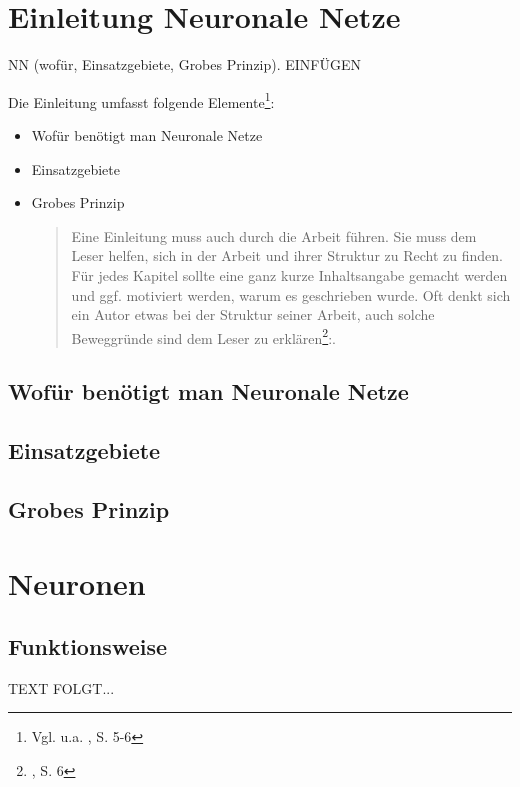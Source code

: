 \newpage
\thispagestyle{empty}
\section{Einleitung Neuronale Netze}\label{sec:einleitung_nn}   
NN (wofür, Einsatzgebiete, Grobes Prinzip). EINFÜGEN

\vspace{1cm}
\begin{tcolorbox}[title={Inhalt}]
Die Einleitung umfasst folgende Elemente\footnote{Vgl. u.a. \cite{BBoJ}, S. 5-6}:
\begin{itemize}
\item Wofür benötigt man Neuronale Netze
\item Einsatzgebiete
\item Grobes Prinzip
  \begin{quotation}
    Eine Einleitung muss auch durch die Arbeit führen. Sie muss dem Leser helfen, sich in der Arbeit und ihrer Struktur zu Recht zu finden. Für jedes Kapitel sollte eine ganz kurze Inhaltsangabe gemacht werden und ggf. motiviert werden, warum es geschrieben wurde. Oft denkt sich ein Autor etwas bei der Struktur seiner Arbeit, auch solche Beweggründe sind dem Leser zu erklären\footnote{\cite{BBoJ}, S. 6}:. 
  \end{quotation}
\end{itemize}
\end{tcolorbox}

\subsection{Wofür benötigt man Neuronale Netze}\label{subsec:einleitung_nn:wofuer_nn} 

\subsection{Einsatzgebiete}\label{subsec:einleitung_nn:einsatzgebiete}

\subsection{Grobes Prinzip}\label{subsec:einleitung_nn_grobes:prinzip}


\newpage  
\section{Neuronen}\label{sec:neuronen}
  
\newpage
\subsection{Funktionsweise}\label{subsec:neuronen:funktionsweise}
  TEXT FOLGT... 
 


